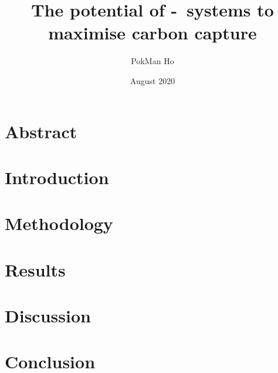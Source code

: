 \documentclass[a4paper,11pt]{article}
\title{The potential of \phy-\bac\ systems to maximise carbon capture}
\author{PokMan Ho}
\date{August 2020}
\begin{document}
\maketitle



\section{Abstract}


\section{Introduction}


\section{Methodology}


\section{Results}



\section{Discussion}



\section{Conclusion}




\nocite{*}\printbibliography
\clearpage

\end{document}
